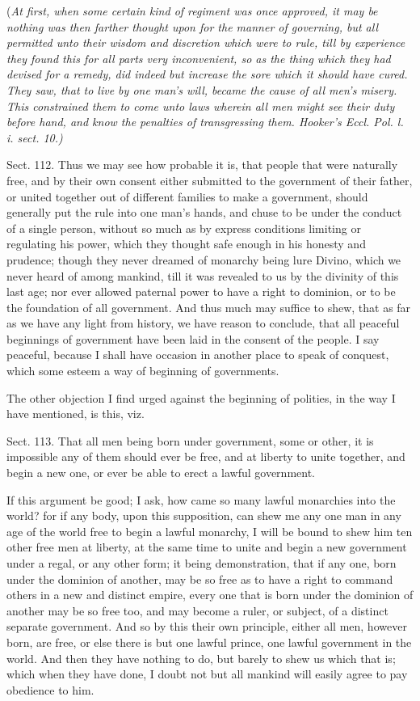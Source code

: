 \documentclass[11pt,openany]{book}
\begin{document}
(\emph{At first, when some certain kind of regiment was once approved, it may be nothing was then farther thought upon for the manner of governing, but all permitted unto their wisdom and discretion which were to rule, till by experience they found this for all parts very inconvenient, so as the thing which they had devised for a remedy, did indeed but increase the sore which it should have cured. They saw, that to live by one man's will, became the cause of all men's misery. This constrained them to come unto laws wherein all men might see their duty before hand, and know the penalties of transgressing them. Hooker's Eccl. Pol. l. i. sect. 10.)}

Sect. 112. Thus we may see how probable it is, that people that were naturally free, and by their own consent either submitted to the government of their father, or united together out of different families to make a government, should generally put the rule into one man's hands, and chuse to be under the conduct of a single person, without so much as by express conditions limiting or regulating his power, which they thought safe enough in his honesty and prudence; though they never dreamed of monarchy being lure Divino, which we never heard of among mankind, till it was revealed to us by the divinity of this last age; nor ever allowed paternal power to have a right to dominion, or to be the foundation of all government. And thus much may suffice to shew, that as far as we have any light from history, we have reason to conclude, that all peaceful beginnings of government have been laid in the consent of the people. I say peaceful, because I shall have occasion in another place to speak of conquest, which some esteem a way of beginning of governments.

The other objection I find urged against the beginning of polities, in the way I have mentioned, is this, viz.

Sect. 113. That all men being born under government, some or other, it is impossible any of them should ever be free, and at liberty to unite together, and begin a new one, or ever be able to erect a lawful government.

If this argument be good; I ask, how came so many lawful monarchies into the world? for if any body, upon this supposition, can shew me any one man in any age of the world free to begin a lawful monarchy, I will be bound to shew him ten other free men at liberty, at the same time to unite and begin a new government under a regal, or any other form; it being demonstration, that if any one, born under the dominion of another, may be so free as to have a right to command others in a new and distinct empire, every one that is born under the dominion of another may be so free too, and may become a ruler, or subject, of a distinct separate government. And so by this their own principle, either all men, however born, are free, or else there is but one lawful prince, one lawful government in the world. And then they have nothing to do, but barely to shew us which that is; which when they have done, I doubt not but all mankind will easily agree to pay obedience to him.
\end{document}
